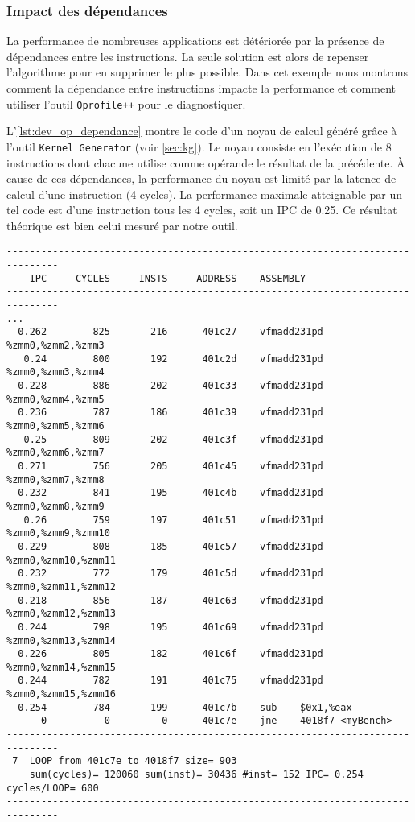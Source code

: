    \subsubsection{Impact des dépendances}
        La performance de nombreuses applications est détériorée par la présence de dépendances entre les instructions. La seule solution est alors de repenser l'algorithme pour en supprimer le plus possible. Dans cet exemple nous montrons comment la dépendance entre instructions impacte la performance et comment utiliser l'outil \verb=Oprofile++= pour le diagnostiquer. 
        
        L'\autoref{lst:dev_op_dependance} montre le code d'un noyau de calcul généré grâce à l'outil \verb|Kernel Generator| (voir \autoref{sec:kg}). Le noyau consiste en l'exécution de 8 instructions dont chacune utilise comme opérande le résultat de la précédente. À cause de ces dépendances, la performance du noyau est limité par la latence de calcul d'une instruction (4 cycles). La performance maximale atteignable par un tel code est d’une instruction tous les 4 cycles, soit un IPC de 0.25. Ce résultat théorique est bien celui mesuré par notre outil. 
        
        
 \begin{lstlisting}[label=lst:dev_op_dependance, caption=Noyau de calcul présentant une dépendance entre chaque instruction.]
-------------------------------------------------------------------------------
    IPC     CYCLES     INSTS     ADDRESS    ASSEMBLY                         
-------------------------------------------------------------------------------
...
  0.262        825       216      401c27    vfmadd231pd %zmm0,%zmm2,%zmm3
   0.24        800       192      401c2d    vfmadd231pd %zmm0,%zmm3,%zmm4
  0.228        886       202      401c33    vfmadd231pd %zmm0,%zmm4,%zmm5
  0.236        787       186      401c39    vfmadd231pd %zmm0,%zmm5,%zmm6
   0.25        809       202      401c3f    vfmadd231pd %zmm0,%zmm6,%zmm7
  0.271        756       205      401c45    vfmadd231pd %zmm0,%zmm7,%zmm8
  0.232        841       195      401c4b    vfmadd231pd %zmm0,%zmm8,%zmm9
   0.26        759       197      401c51    vfmadd231pd %zmm0,%zmm9,%zmm10
  0.229        808       185      401c57    vfmadd231pd %zmm0,%zmm10,%zmm11
  0.232        772       179      401c5d    vfmadd231pd %zmm0,%zmm11,%zmm12
  0.218        856       187      401c63    vfmadd231pd %zmm0,%zmm12,%zmm13
  0.244        798       195      401c69    vfmadd231pd %zmm0,%zmm13,%zmm14
  0.226        805       182      401c6f    vfmadd231pd %zmm0,%zmm14,%zmm15
  0.244        782       191      401c75    vfmadd231pd %zmm0,%zmm15,%zmm16
  0.254        784       199      401c7b    sub    $0x1,%eax
      0          0         0      401c7e    jne    4018f7 <myBench>
-------------------------------------------------------------------------------
_7_ LOOP from 401c7e to 4018f7 size= 903 
    sum(cycles)= 120060 sum(inst)= 30436 #inst= 152 IPC= 0.254 cycles/LOOP= 600
-------------------------------------------------------------------------------
\end{lstlisting}

